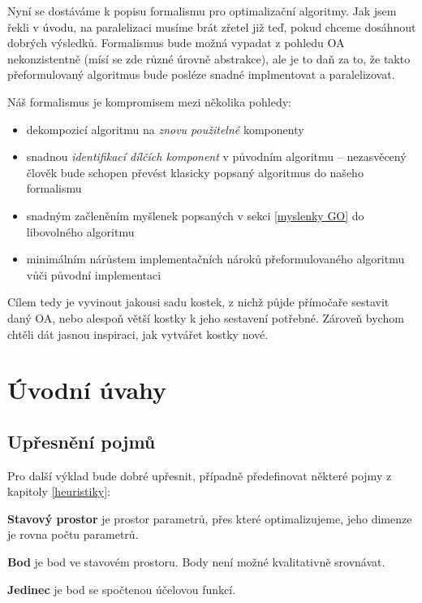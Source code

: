 
Nyní se dostáváme k popisu formalismu pro optimalizační algoritmy. Jak jsem řekli v úvodu, na paralelizaci musíme brát zřetel již teď, pokud chceme dosáhnout dobrých výsledků. Formalismus bude možná vypadat z pohledu OA nekonzistentně (mísí se zde různé úrovně abstrakce), ale je to daň za to, že takto přeformulovaný algoritmus bude posléze snadné implmentovat a paralelizovat.

Náš formalismus je kompromisem mezi několika pohledy: 
\begin{itemize}
  \item dekompozicí algoritmu na \emph{znovu použitelné} komponenty
  \item snadnou \emph{identifikací dílčích komponent} v původním algoritmu -- nezasvěcený člověk bude schopen převést klasicky popsaný algoritmus do našeho formalismu
  \item snadným začleněním myšlenek popsaných v sekci \ref{myslenky GO} do libovolného algoritmu
  \item minimálním nárůstem implementačních nároků přeformulovaného algoritmu vůči původní implementaci
\end{itemize}

Cílem tedy je vyvinout jakousi sadu kostek, z nichž půjde přímočaře sestavit daný OA, nebo alespoň větší kostky k jeho sestavení potřebné. Zároveň bychom chtěli dát jasnou inspiraci, jak vytvářet kostky nové.

\section{Úvodní úvahy}
\subsection{Upřesnění pojmů}
Pro další výklad bude dobré upřesnit, případně předefinovat některé pojmy z kapitoly \ref{heuristiky}:

\par{\textbf{Stavový prostor} je prostor parametrů, přes které optimalizujeme, jeho dimenze je rovna počtu parametrů.}

\par{\textbf{Bod} je bod ve stavovém prostoru. Body není možné kvalitativně srovnávat.}

\par{\textbf{Jedinec} je bod se spočtenou účelovou funkcí.}

